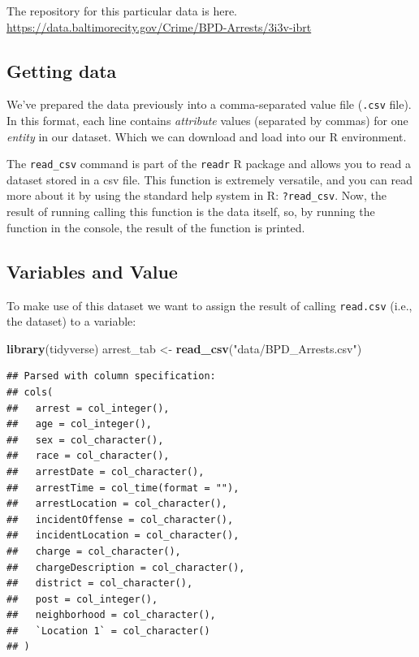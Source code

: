 \documentclass[]{article}
\newenvironment{Shaded}{\begin{snugshade}}{\end{snugshade}}
\newcommand{\KeywordTok}[1]{\textcolor[rgb]{0.13,0.29,0.53}{\textbf{{#1}}}}
\newcommand{\StringTok}[1]{\textcolor[rgb]{0.31,0.60,0.02}{{#1}}}
\newcommand{\NormalTok}[1]{{#1}}
\theoremstyle{definition}
\theoremstyle{definition}
\theoremstyle{remark}
\begin{document}
The repository for this particular data is here.
\href{https://data.baltimorecity.gov/Crime/BPD-Arrests/3i3v-ibrt}{\url{https://data.baltimorecity.gov/Crime/BPD-Arrests/3i3v-ibrt}}

\subsection{Getting data}\label{getting-data}

We've prepared the data previously into a comma-separated value file
(\texttt{.csv} file). In this format, each line contains
\emph{attribute} values (separated by commas) for one \emph{entity} in
our dataset. Which we can download and load into our R environment.

The \texttt{read\_csv} command is part of the \texttt{readr} R package
and allows you to read a dataset stored in a csv file. This function is
extremely versatile, and you can read more about it by using the
standard help system in R: \texttt{?read\_csv}. Now, the result of
running calling this function is the data itself, so, by running the
function in the console, the result of the function is printed.

\subsection{Variables and Value}\label{variables-and-value}

To make use of this dataset we want to assign the result of calling
\texttt{read.csv} (i.e., the dataset) to a variable:

\begin{Shaded}
\begin{Highlighting}[]
\KeywordTok{library}\NormalTok{(tidyverse)}
\NormalTok{arrest_tab <-}\StringTok{ }\KeywordTok{read_csv}\NormalTok{(}\StringTok{"data/BPD_Arrests.csv"}\NormalTok{)}
\end{Highlighting}
\end{Shaded}

\begin{verbatim}
## Parsed with column specification:
## cols(
##   arrest = col_integer(),
##   age = col_integer(),
##   sex = col_character(),
##   race = col_character(),
##   arrestDate = col_character(),
##   arrestTime = col_time(format = ""),
##   arrestLocation = col_character(),
##   incidentOffense = col_character(),
##   incidentLocation = col_character(),
##   charge = col_character(),
##   chargeDescription = col_character(),
##   district = col_character(),
##   post = col_integer(),
##   neighborhood = col_character(),
##   `Location 1` = col_character()
## )
\end{verbatim}
\end{document}
